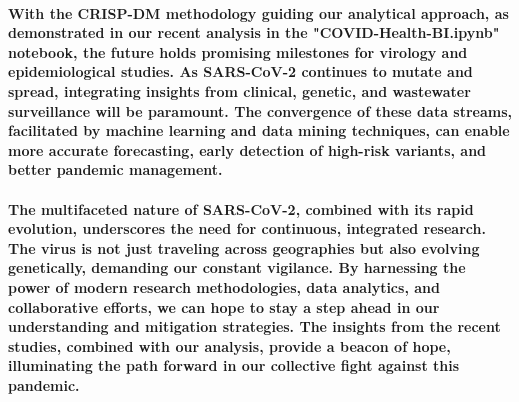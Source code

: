 \documentclass{article}
\begin{document}
\paragraph{With the CRISP-DM methodology guiding our analytical approach, as demonstrated in our recent analysis in the "COVID-Health-BI.ipynb" notebook, the future holds promising milestones for virology and epidemiological studies. As SARS-CoV-2 continues to mutate and spread, integrating insights from clinical, genetic, and wastewater surveillance will be paramount. The convergence of these data streams, facilitated by machine learning and data mining techniques, can enable more accurate forecasting, early detection of high-risk variants, and better pandemic management.}
\paragraph{The multifaceted nature of SARS-CoV-2, combined with its rapid evolution, underscores the need for continuous, integrated research. The virus is not just traveling across geographies but also evolving genetically, demanding our constant vigilance. By harnessing the power of modern research methodologies, data analytics, and collaborative efforts, we can hope to stay a step ahead in our understanding and mitigation strategies. The insights from the recent studies, combined with our analysis, provide a beacon of hope, illuminating the path forward in our collective fight against this pandemic.}
\printbibliography
\end{document}
